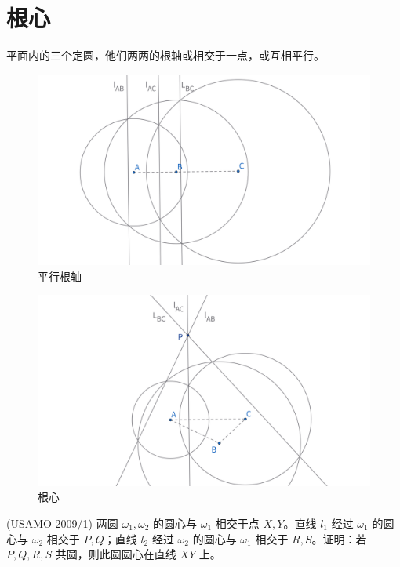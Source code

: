 \section{根心}
\begin{theorem}[根心定理]
    平面内的三个定圆，他们两两的根轴或相交于一点，或互相平行。
\end{theorem}
\begin{figure}[H]
    \centering
    \includegraphics[width=0.8\linewidth]{figures/平行根轴.png}
    \caption{平行根轴}
\end{figure}
\begin{figure}[H]
    \centering
    \includegraphics[width=0.8\linewidth]{figures/根心.png}
    \caption{根心}
\end{figure}


\begin{exercise}
(USAMO 2009/1) 两圆 $\omega_1, \omega_2$ 的圆心与 $\omega_1$ 相交于点 $X, Y$。直线 $l_1$ 经过 $\omega_1$ 的圆心与 $\omega_2$ 相交于 $P, Q$；直线 $l_2$ 经过 $\omega_2$ 的圆心与 $\omega_1$ 相交于 $R, S$。证明：若 $P, Q, R, S$ 共圆，则此圆圆心在直线 $XY$ 上。
\end{exercise}